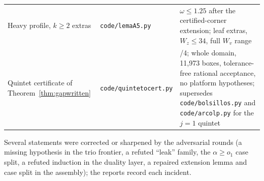 \documentclass[11pt]{article}
\theoremstyle{definition}
\begin{document}
\begin{center}
\begin{longtable}{>{\raggedright\arraybackslash}p{}>{\raggedright\arraybackslash}p{}>{\raggedright\arraybackslash}p{}}
Heavy profile, $k\ge2$ extras & \texttt{code/lemaA5.py} &
$\omega\le1.25$ after the certified-corner extension; leaf extras,
$W_z\le34$, full $W_v$ range \\
Quintet certificate of Theorem~\ref{thm:gapwritten} & \texttt{code/quintetocert.py} & 4/4; whole domain, 11{,}973 boxes, tolerance-free rational acceptance, no platform hypotheses; supersedes \texttt{code/bolsillos.py} and
\texttt{code/arcolp.py} for the $j=1$ quintet \\
\hline
\end{longtable}
\end{center}

Several statements were corrected or sharpened by the adversarial
rounds (a missing hypothesis in the trio frontier, a refuted
``leak'' family, the $\alpha\ge o_1$ case split, a refuted
induction in the duality layer, a repaired extension lemma and case
split in the assembly); the reports record each incident.
\end{document}
